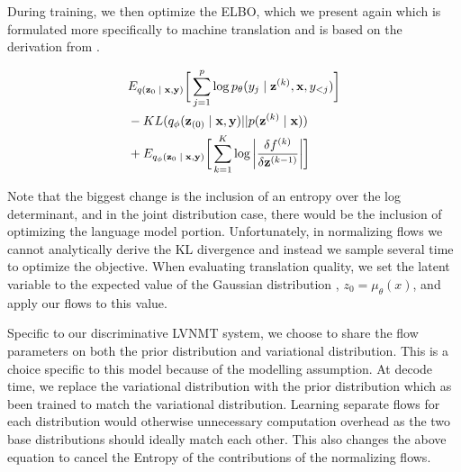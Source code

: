 During training, we then optimize the \ac{ELBO}, which we present again which is formulated more specifically to machine translation and is based on the derivation from \citealp[Section 4.2]{rezende2015VIwithNF}.

\begin{align}
\begin{split}\label{eq:2}
&
E_{q(\textbf{z}_{0}\; | \;{\textbf{x}, \textbf{y}})} \bigg[ \sum_{j=1}^{p} \log p_{\theta}(y_{j} \; | \;{\textbf{z}^{(k)}}, \textbf{x}, y_{<j}) \bigg] \\
& - KL(q_{\phi}(\textbf{z}_{(0)} \; | \;{\textbf{x}, \textbf{y}}) || p(\textbf{z}^{(k)} \; | \;{\textbf{x}})) \\
&   +  E_{q_{\phi}(\textbf{z}_{0} \; | \;{\textbf{x}, \textbf{y}})} \bigg[\sum_{k=1}^{K} \log \bigg|\frac{\delta f^{(k)}}{\delta \textbf{z}^{(k-1)}} \bigg| \bigg]  
\end{split}
\end{align}

Note that the biggest change is the inclusion of an entropy over the log determinant, and in the joint distribution case, there would be the inclusion of optimizing the language model portion. Unfortunately, in normalizing flows we cannot analytically derive the KL divergence and instead we sample several time to optimize the objective. When evaluating translation quality, we set the latent variable to the expected value of the Gaussian distribution , $z_{0} = \mu_{\theta}(x)$, and apply our flows to this value.

Specific to our discriminative \ac{LVNMT} system, we choose to share the flow parameters on both the prior distribution and variational distribution. This is a choice specific to this model because of the modelling assumption. At decode time, we replace the variational distribution with the prior distribution which as been trained to match the variational distribution. Learning separate flows for each distribution would otherwise unnecessary computation overhead as the two base distributions should ideally match each other. This also changes the above equation to cancel the Entropy of the contributions of the normalizing flows. 








